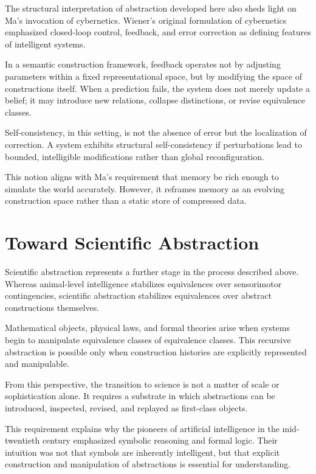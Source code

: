 \documentclass[11pt]{article}
\begin{document}
The structural interpretation of abstraction developed here also sheds
light on Ma’s invocation of cybernetics. Wiener’s original formulation of
cybernetics emphasized closed-loop control, feedback, and error correction
as defining features of intelligent systems.

In a semantic construction framework, feedback operates not by adjusting
parameters within a fixed representational space, but by modifying the
space of constructions itself. When a prediction fails, the system does
not merely update a belief; it may introduce new relations, collapse
distinctions, or revise equivalence classes.

Self-consistency, in this setting, is not the absence of error but the
localization of correction. A system exhibits structural self-consistency
if perturbations lead to bounded, intelligible modifications rather than
global reconfiguration.

This notion aligns with Ma’s requirement that memory be rich enough to
simulate the world accurately. However, it reframes memory as an evolving
construction space rather than a static store of compressed data.

\section{Toward Scientific Abstraction}

Scientific abstraction represents a further stage in the process described
above. Whereas animal-level intelligence stabilizes equivalences over
sensorimotor contingencies, scientific abstraction stabilizes equivalences
over abstract constructions themselves.

Mathematical objects, physical laws, and formal theories arise when systems
begin to manipulate equivalence classes of equivalence classes. This
recursive abstraction is possible only when construction histories are
explicitly represented and manipulable.

From this perspective, the transition to science is not a matter of scale
or sophistication alone. It requires a substrate in which abstractions can
be introduced, inspected, revised, and replayed as first-class objects.

This requirement explains why the pioneers of artificial intelligence in
the mid-twentieth century emphasized symbolic reasoning and formal logic.
Their intuition was not that symbols are inherently intelligent, but that
explicit construction and manipulation of abstractions is essential for
understanding.
\end{document}
